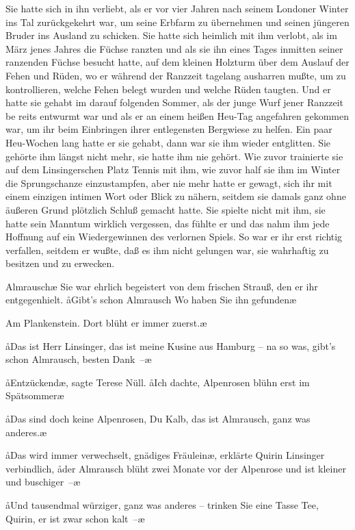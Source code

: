 Sie hatte sich in ihn verliebt, als er vor vier Jahren nach
seinem Londoner Winter ins Tal zurückgekehrt war, um seine
Erbfarm zu übernehmen und seinen jüngeren Bruder ins
Ausland zu schicken. Sie hatte sich heimlich mit ihm verlobt,
als im März jenes Jahres die Füchse ranzten und als sie ihn
eines Tages inmitten seiner ranzenden Füchse besucht hatte,
auf dem kleinen Holzturm über dem Auslauf der Fehen und
Rüden, wo er während der Ranzzeit tagelang ausharren
mußte, um zu kontrollieren, welche Fehen belegt wurden
und welche Rüden taugten. Und er hatte sie gehabt im darauf\-%
folgenden Sommer, als der junge Wurf jener Ranzzeit be\-%
reits entwurmt war und als er an einem heißen Heu-Tag
angefahren gekommen war, um ihr beim Einbringen ihrer
entlegensten Bergwiese zu helfen. Ein paar Heu-Wochen
lang hatte er sie gehabt, dann war sie ihm wieder entglitten.
Sie gehörte ihm längst nicht mehr, sie hatte ihm nie gehört.
Wie zuvor trainierte sie auf dem Linsingerschen Platz Tennis
mit ihm, wie zuvor half sie ihm im Winter die Sprungschanze
einzustampfen, aber nie mehr hatte er gewagt, sich ihr mit
einem einzigen intimen Wort oder Blick zu nähern, seitdem
sie damals ganz ohne äußeren Grund plötzlich Schluß gemacht
hatte. Sie spielte nicht mit ihm, sie hatte sein Manntum
wirklich vergessen, das fühlte er und das nahm ihm jede
Hoffnung auf ein Wiedergewinnen des verlornen Spiels. So
war er ihr erst richtig verfallen, seitdem er wußte, daß es
ihm nicht gelungen war, sie wahrhaftig zu besitzen und zu
erwecken.

\aanah Almrausch\ausr\ae{} Sie war ehrlich begeistert von dem frischen
Strauß, den er ihr entgegenhielt. \aa Gibt's schon Almrausch\frag{}
Wo haben Sie ihn gefunden\frag\ae

\aanah Am Plankenstein. Dort blüht er immer zuerst.\ae

\aa Das ist Herr Linsinger, das ist meine Kusine aus Hamburg --
na so was, gibt's schon Almrausch, besten Dank~--\ae

\aa Entzückend\ae, sagte Terese Nüll. \aa Ich dachte, Alpenrosen
blühn erst im Spätsommer\frag\ae

\aa Das sind doch keine Alpenrosen, Du Kalb, das ist Almrausch,
ganz was anderes.\ae

\aa Das wird immer verwechselt, gnädiges Fräulein\ae, erklärte
Quirin Linsinger verbindlich, \aa der Almrausch blüht zwei
Monate vor der Alpenrose und ist kleiner und buschiger~--\ae

\aa Und tausendmal würziger, ganz was anderes -- trinken Sie
eine Tasse Tee, Quirin, er ist zwar schon kalt~--\ae

